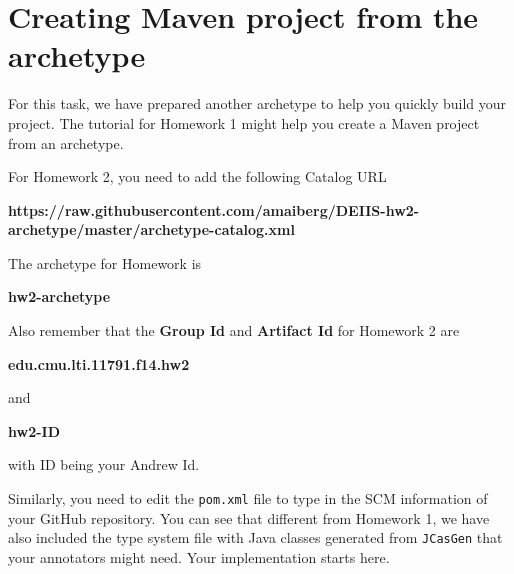 
\section{Creating Maven project from the archetype}

For this task, we have prepared another archetype to help you quickly build your
project. The tutorial for Homework 1 might help you create a Maven project from
an archetype.

For Homework 2, you need to add the following Catalog URL

\begin{center}
\textbf{https://raw.githubusercontent.com/amaiberg/DEIIS-hw2-archetype/master/archetype-catalog.xml}
\end{center}

The archetype for Homework is

\begin{center}
\textbf{hw2-archetype}
\end{center}

Also remember that the \textbf{Group Id} and \textbf{Artifact Id} for Homework 2
are

\begin{center}
\textbf{edu.cmu.lti.11791.f14.hw2}
\end{center}

and

\begin{center}
\textbf{hw2-ID}
\end{center}

with ID being your Andrew Id.

Similarly, you need to edit the \texttt{pom.xml} file to type in the SCM
information of your GitHub repository. You can see that different from Homework
1, we have also included the type system file with Java classes generated from
\texttt{JCasGen} that your annotators might need. Your implementation starts
here.
